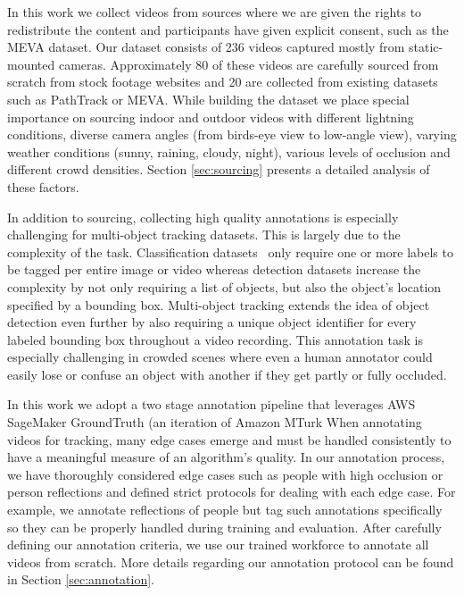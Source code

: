 \documentclass[runningheads]{llncs}
\begin{document}
In this work we collect videos from sources where we are given the rights to redistribute the content and participants have given explicit consent, such as the MEVA\cite{meva} dataset. 
Our dataset consists of 236 videos captured mostly from static-mounted cameras. Approximately 80 of these videos are carefully sourced from scratch from stock footage websites and 20 are collected from existing datasets such as PathTrack\cite{pathtrack} or MEVA\cite{meva}. 
While building the dataset we place special importance on sourcing indoor and outdoor videos with different lightning conditions, diverse camera angles (from birds-eye view to low-angle view), varying weather conditions (sunny, raining, cloudy, night), various levels of occlusion and different crowd densities.
Section \ref{sec:sourcing} presents a detailed analysis of these factors. 

In addition to sourcing, collecting high quality annotations is especially challenging for multi-object tracking datasets. This is largely due to the complexity of the task. Classification datasets~\cite{imagenet,kinetics} only require one or more labels to be tagged per entire image or video whereas detection datasets \cite{mscoco,pascal} increase the complexity by not only requiring a list of objects, but also the object's location specified by a bounding box. Multi-object tracking extends the idea of object detection even further by also requiring a unique object identifier for every labeled bounding box throughout a video recording. This annotation task is especially challenging in crowded scenes where even a human annotator could easily lose or confuse an object with another if they get partly or fully occluded. 

In this work we adopt a two stage annotation pipeline that leverages AWS SageMaker GroundTruth (an iteration of Amazon MTurk
When annotating videos for tracking, many edge cases emerge and must be handled consistently to have a meaningful measure of an algorithm's quality.
In our annotation process, we have thoroughly considered edge cases such as people with high occlusion or person reflections and defined strict protocols for dealing with each edge case. For example, we annotate reflections of people but tag such annotations specifically so they can be properly handled during training and evaluation. After carefully defining our annotation criteria, we use our trained workforce to annotate all videos from scratch.
More details regarding our annotation protocol can be found in Section \ref{sec:annotation}. 
\end{document}
